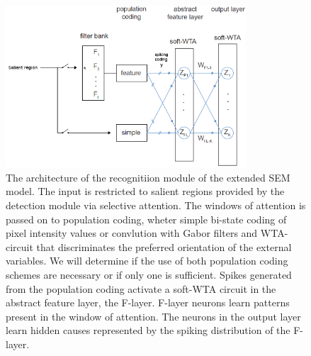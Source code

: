 \documentclass{report}
\begin{document}
\begin{figure}[ht]
\centering
\includegraphics[width=0.8\textwidth]{architecture_recognition}
\caption{The architecture of the recognitiion module of the extended SEM model. The input is restricted to salient regions provided by the detection module via selective attention. The windows of attention is passed on to population coding, wheter simple bi-state coding of pixel intensity values or convlution with Gabor filters and WTA-circuit that discriminates the preferred orientation of the external variables. We will determine if the use of both population coding schemes are necessary or if only one is sufficient. Spikes generated from the population coding activate a soft-WTA circuit in the abstract feature layer, the F-layer. F-layer neurons learn patterns present in the window of attention. The neurons in the output layer learn hidden causes represented by the spiking distribution of the F-layer. 
\label{fig:architecture_recognition}}
\end{figure}
\end{document}

